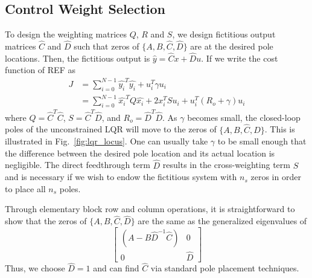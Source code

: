 \documentclass[journal,twocolumn,twoside]{IEEEtran}
\begin{document}
\subsection{Control Weight Selection}
To design the weighting matrices $Q$, $R$ and $S$, we design fictitious output matrices $\hat C$ and $\hat D$ such that zeros of $\{A, B, \hat C, \hat D\}$ are at the desired pole locations. Then, the fictitious output is $\hat y = \hat C x + \hat D u$. If we write the cost function of REF as
\begin{align}
  J &= \sum_{i=0}^{N-1} \hat{y_i}^T\hat{y_i} + u_i^T\gamma u_i\\
    &= \sum_{i=0}^{N-1} \hat{x_i}^TQ\hat{x_i} + 2x_i^TSu_i + u_i^T(R_o+\gamma)u_i
\end{align}
where $Q = \hat{C}^T\hat{C}$, $S =\hat{C}^T \hat{D}$, and $R_o = \hat{D}^T\hat{D}$. As $\gamma$ becomes small, the closed-loop poles of the unconstrained LQR will move to the zeros of $\{A, B, \hat C, \hat D\}$. This is illustrated in Fig.~\ref{fig:lqr_locus}. One can usually take $\gamma$ to be small enough that the difference between the desired pole location and its actual location is negligible. The direct feedthrough term $\hat D$ results in the cross-weighting term $S$ and is necessary if we wish to endow the fictitious system with $n_s$ zeros in order to place all $n_s$ poles.

Through elementary block row and column operations, it is straightforward to show that the zeros of
$\{A, B, \hat C, \hat D\}$ are the same as the generalized eigenvalues of
\begin{equation}
  \begin{bmatrix}
    (A - B\hat{D}^{-1}\hat{C}) & 0\\
    0 & \hat{D}
  \end{bmatrix}
\end{equation}
Thus, we choose $\hat D = 1$ and can find $\hat C$ via standard pole placement techniques.

\begin{figure*}
  \begin{minipage}{0.48\textwidth}
  
  \caption{Root locus for $R_o + \gamma$. Note that for clarity, the plant zeros are not shown. The black 'x's indicate the poles of the open-loop plant. The blue circles indicate the fictitious zeros, which are at the location of the desired poles. }
  \label{fig:lqr_locus}
\end{minipage}
\hfill
\begin{minipage}{0.48\textwidth}
  
  \caption{Root locus for $R_o + \gamma$. Note that for clarity, the plant zeros are not shown. The black 'x's indicate the poles of the open-loop plant. The blue circles indicate the fictitious zeros, which are at the location of the desired poles. }
  \label{fig:lqr_locus}
\end{minipage}
\end{figure*}
\end{document}

